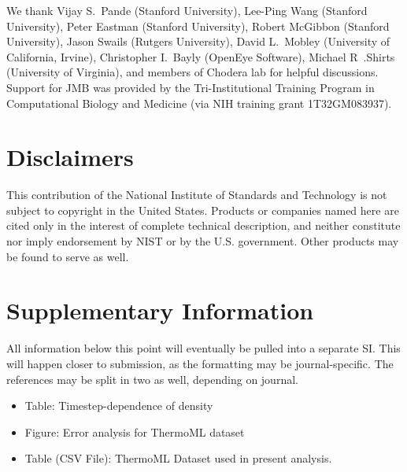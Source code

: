 \documentclass[aps,pre,twocolumn,nofootinbib,superscriptaddress,linenumbers]{revtex4-1}
\begin{document}
We thank Vijay S.~Pande (Stanford University), Lee-Ping Wang (Stanford University), Peter Eastman (Stanford University), Robert McGibbon (Stanford University), Jason Swails (Rutgers University), David L.~Mobley (University of California, Irvine), Christopher I.~Bayly (OpenEye Software), Michael R~.Shirts (University of Virginia), and members of Chodera lab for helpful discussions.  
Support for JMB was provided by the Tri-Institutional Training Program in Computational Biology and Medicine (via NIH training grant 1T32GM083937).


\section{Disclaimers}

This contribution of the National Institute of Standards and Technology is not subject to copyright in the United States.  
Products or companies named here are cited only in the interest of complete technical description, and neither constitute nor imply endorsement by NIST or by the U.S. government.  Other products may be found to serve as well.

\clearpage

\appendix 

\section{Supplementary Information}

All information below this point will eventually be pulled into a separate SI.  
This will happen closer to submission, as the formatting may be journal-specific.  
The references may be split in two as well, depending on journal.

\begin{itemize}
 \item Table: Timestep-dependence of density
 \item Figure: Error analysis for ThermoML dataset
 \item Table (CSV File): ThermoML Dataset used in present analysis.
\end{itemize}
\end{document}
